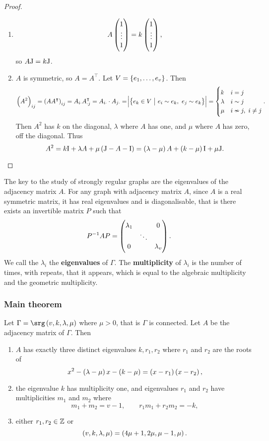 \begin{proof}
\hfill
\begin{enumerate}
\item
$$ A\begin{pmatrix} 1 \\ \vdots \\ 1 \end{pmatrix} = k\begin{pmatrix} 1 \\ \vdots \\ 1 \end{pmatrix}, $$
so $ A\mathrm{J} = k\mathrm{J} $.
\item $ A $ is symmetric, so $ A = A^\intercal $. Let $ V = \cbr{e_1, \dots, e_v} $. Then
$$ \br{A^2}_{ij} = \br{AA^\intercal}_{ij} = A_{i\cdot}A_{\cdot j}^\intercal = A_{i\cdot} \cdot A_{j\cdot} = \abs{\cbr{e_k \in V \st e_i \sim e_k, \ e_j \sim e_k}} =
\begin{cases}
k & i = j \\
\lambda & i \sim j \\
\mu & i \nsim j, \ i \ne j
\end{cases}.
$$
Then $ A^2 $ has $ k $ on the diagonal, $ \lambda $ where $ A $ has one, and $ \mu $ where $ A $ has zero, off the diagonal. Thus
$$ A^2 = k\I + \lambda A + \mu\br{\J - A - \I} = \br{\lambda - \mu}A + \br{k - \mu}\I + \mu\J. $$
\end{enumerate}
\end{proof}

The key to the study of strongly regular graphs are the eigenvalues of the adjacency matrix $ A $. For any graph with adjacency matrix $ A $, since $ A $ is a real symmetric matrix, it has real eigenvalues and is diagonalisable, that is there exists an invertible matrix $ P $ such that
$$ P^{-1}AP = \begin{pmatrix} \lambda_1 &  & 0 \\  & \ddots &  \\ 0 &  & \lambda_v \end{pmatrix}. $$
We call the $ \lambda_i $ the \textbf{eigenvalues} of $ \Gamma $. The \textbf{multiplicity} of $ \lambda_i $ is the number of times, with repeats, that it appears, which is equal to the algebraic multiplicity and the geometric multiplicity.

\pagebreak

\subsubsection{Main theorem}

\begin{theorem}
\label{thm:2.7}
Let $ \Gamma = \srg\br{v, k, \lambda, \mu} $ where $ \mu > 0 $, that is $ \Gamma $ is connected. Let $ A $ be the adjacency matrix of $ \Gamma $. Then
\begin{enumerate}
\item $ A $ has exactly three distinct eigenvalues $ k, r_1, r_2 $ where $ r_1 $ and $ r_2 $ are the roots of
$$ x^2 - \br{\lambda - \mu}x - \br{k - \mu} = \br{x - r_1}\br{x - r_2}, $$
\item the eigenvalue $ k $ has multiplicity one, and eigenvalues $ r_1 $ and $ r_2 $ have multiplicities $ m_1 $ and $ m_2 $ where
$$ m_1 + m_2 = v - 1, \qquad r_1m_1 + r_2m_2 = -k, $$
\item either $ r_1, r_2 \in \mathbb{Z} $ or
$$ \br{v, k, \lambda, \mu} = \br{4\mu + 1, 2\mu, \mu - 1, \mu}. $$
\end{enumerate}
\end{theorem}

